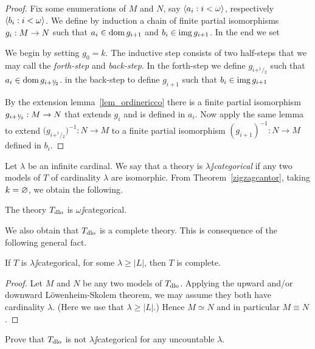 \documentclass[creche.tex]{subfiles}
\begin{document}
\begin{proof}
Fix some enumerations of $M$ and $N$, say $\langle a_i:i<\omega\rangle$, respectively $\langle b_i:i<\omega\rangle$.  We define by induction a chain of finite partial isomorphisms $g_i:M\rightarrow N$ such that $a_i\in\mathop{\rm dom} g_{i+1}$ and $b_i\in\mathop{\rm img} g_{i+1}$. In the end we set


We begin by setting $g_0=k$. The inductive step consists of two half-steps that we may call the \textit{forth-step} and \textit{back-step}. In the forth-step we define $g_{i+^1\!\!/\!_2}$ such that $a_i\in\mathop{\rm dom} g_{i+^1\!\!/\!_2}$. in the back-step to define $g_{i+1}$ such that $b_i\in\mathop{\rm img} g_{i+1}$

By the extension lemma~\ref{lem_ordinericco} there is a finite partial isomorphism $g_{i+^1\!\!/\!_2}:M\rightarrow N$ that extends $g_i$ and is defined in $a_i$. Now apply the same lemma to extend $\big(g_{i+^1\!\!/\!_2}\big)^{-1}:N\to M$ to a finite partial isomorphism $(g_{i+1})^{-1}:N\to M$ defined in $b_i$.
\end{proof}

Let $\lambda$ be an infinite cardinal. We say that a theory is \emph{$\lambda\jj$categorical\/} if any two models of $T$ of cardinality $\lambda$ are isomorphic. From Theorem~\ref{zigzagcantor}, taking $k=\varnothing$, we obtain the following.
 
\begin{corollary}
The theory $T_{\rm dlo}$ is $\omega\jj$categorical.\QED
\end{corollary}

We also obtain that $T_{\rm dlo}$ is a complete theory. This is consequence of the following general fact.

\begin{proposition}\label{thm_categorical->complete}
If $T$ is $\lambda\jj$categorical, for some $\lambda\ge|L|$, then $T$ is complete.
\end{proposition}

\begin{proof}
Let $M$ and $N$ be any two models of $T_{\rm dlo}$. Applying the upward and/or downward L\"owenheim-Skolem theorem, we may assume they both have cardinality $\lambda$. (Here we use that $\lambda\ge|L|$.) Hence $M\simeq N$ and in particular $M\equiv N$.
\end{proof}

\begin{exercise}
Prove that $T_{\rm dlo}$ is not $\lambda\jj$categorical for any uncountable $\lambda$.\QED
\end{exercise}
\end{document}
